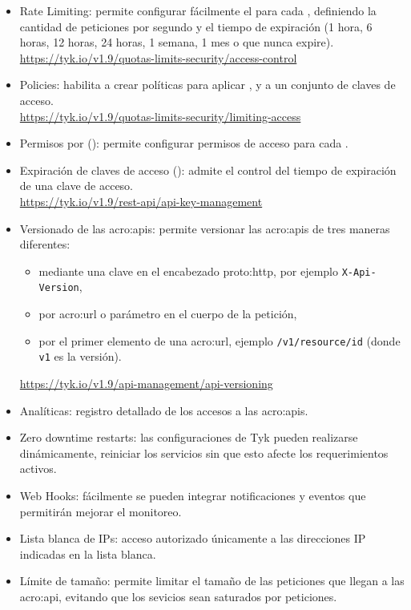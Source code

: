 \begin{itemize}
  \item Rate Limiting: permite configurar fácilmente el  para cada , definiendo la cantidad de peticiones por segundo y el tiempo de expiración (1 hora, 6 horas, 12 horas, 24 horas, 1 semana, 1 mes o que nunca expire). \\
  \url{https://tyk.io/v1.9/quotas-limits-security/access-control}
  \item Policies: habilita a crear políticas para aplicar ,  y  a un conjunto de claves de acceso. \\
  \url{https://tyk.io/v1.9/quotas-limits-security/limiting-access}
  \item Permisos por  (): permite configurar permisos de acceso para cada .
  \item Expiración de claves de acceso (): admite el control del tiempo de expiración de una clave de acceso. \\
  \url{https://tyk.io/v1.9/rest-api/api-key-management}
  \item Versionado de las \glspl{acro:api}: permite versionar las \glspl{acro:api} de tres maneras diferentes:
  \begin{itemize}
    \item mediante una clave en el encabezado \gls{proto:http}, por ejemplo \texttt{X-Api-Version},
    \item por \gls{acro:url} o parámetro en el cuerpo de la petición,
    \item por el primer elemento de una \gls{acro:url}, ejemplo \texttt{/v1/resource/id} (donde \texttt{v1} es la versión).
  \end{itemize}
  \url{https://tyk.io/v1.9/api-management/api-versioning}
  \item Analíticas: registro detallado de los accesos a las \glspl{acro:api}.
  \item Zero downtime restarts: las configuraciones de Tyk pueden realizarse dinámicamente, reiniciar los servicios sin que esto afecte los requerimientos activos.
  \item Web Hooks: fácilmente se pueden integrar notificaciones y eventos que permitirán mejorar el monitoreo.
  \item Lista blanca de IPs: acceso autorizado únicamente a las direcciones IP indicadas en la lista blanca.
  \item Límite de tamaño: permite limitar el tamaño de las peticiones que llegan a las \gls{acro:api}, evitando que los sevicios sean saturados por peticiones.

\end{itemize}
